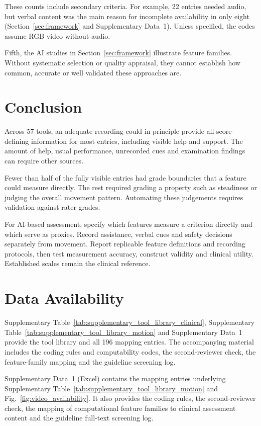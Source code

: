 \documentclass[11pt]{article}
\begin{document}
These counts include secondary criteria. For example, 22 entries needed audio, but verbal content was the main reason for incomplete availability in only eight (Section~\ref{sec:framework} and Supplementary Data~1). Unless specified, the codes assume RGB video without audio.

Fifth, the AI studies in Section~\ref{sec:framework} illustrate feature families. Without systematic selection or quality appraisal, they cannot establish how common, accurate or well validated these approaches are.

\section{Conclusion}

Across 57 tools, an adequate recording could in principle provide all score-defining information for most entries, including visible help and support. The amount of help, usual performance, unrecorded cues and examination findings can require other sources.

Fewer than half of the fully visible entries had grade boundaries that a feature could measure directly. The rest required grading a property such as steadiness or judging the overall movement pattern. Automating these judgements requires validation against rater grades.

For AI-based assessment, specify which features measure a criterion directly and which serve as proxies. Record assistance, verbal cues and safety decisions separately from movement. Report replicable feature definitions and recording protocols, then test measurement accuracy, construct validity and clinical utility. Established scales remain the clinical reference.

\section*{Data Availability}
Supplementary Table~\ref{tab:supplementary_tool_library_clinical}, Supplementary Table~\ref{tab:supplementary_tool_library_motion} and Supplementary Data~1 provide the tool library and all 196 mapping entries. The accompanying material includes the coding rules and computability codes, the second-reviewer check, the feature-family mapping and the guideline screening log.

\printbibliography




\noindent Supplementary Data~1 (Excel) contains the mapping entries underlying Supplementary Table~\ref{tab:supplementary_tool_library_motion} and Fig.~\ref{fig:video_availability}. It also provides the coding rules, the second-reviewer check, the mapping of computational feature families to clinical assessment content and the guideline full-text screening log.
\end{document}
